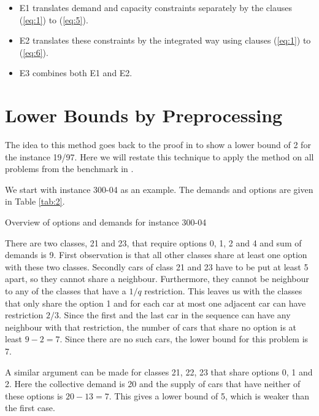 \documentclass[]{llncs}
\begin{document}
\begin{itemize}
    \item E1 translates demand and capacity constraints separately by the clauses (\ref{eq:1}) to (\ref{eq:5}). 
    \item E2 translates these constraints by the integrated way using clauses (\ref{eq:1}) to (\ref{eq:6}).
    \item E3 combines both E1 and E2. 
\end{itemize}

\section{Lower Bounds by Preprocessing}
\label{sec:lower}

The idea to this method goes back to the proof in \cite{Gent98} to show a lower bound of 2 for the instance 19/97. Here
we will restate this technique to apply the method on all problems from the benchmark in \cite{Gravel05}. 

We start with instance 300-04 as an example. The demands and options are given in Table \ref{tab:2}. 

\begin{table}[htbp]
    \caption{Overview of options and demands for instance 300-04}
    \centering
    
    \label{tab:2}
\end{table}

There are two classes, 21 and 23, that require options 0, 1, 2 and 4 and sum of demands is 9. First observation is that
all other classes share at least one option with these two classes.  Secondly cars of class 21 and 23 have to be put at
least 5 apart, so they cannot share a neighbour. Furthermore, they cannot be neighbour to any of the classes that have a
$1/q$ restriction. This leaves us with the classes that only share the option 1 and for each car at most one adjacent
car can have restriction $2/3$. Since the first and the last car in the sequence can have any neighbour with that
restriction, the number of cars that share no option is at least $9-2=7$. Since there are no such cars, the lower bound
for this problem is 7. 

A similar argument can be made for classes 21, 22, 23 that share options 0, 1 and 2. Here the collective demand is 20
and the supply of cars that have neither of these options is $20 - 13 = 7$. This gives a lower bound of 5, which is
weaker than the first case. 

\end{document}
